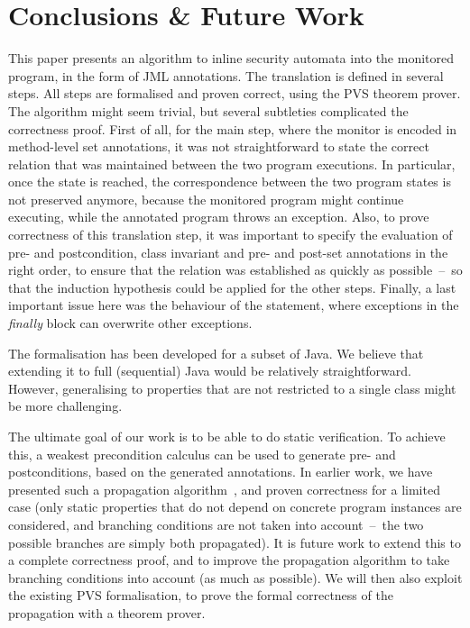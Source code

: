 \section{Conclusions \& Future Work }\label{SecConcl}

This paper presents an algorithm to inline security automata into the
monitored program, in the form of JML annotations. The translation is
defined in several steps. All steps are formalised and proven correct,
using the PVS theorem prover. The algorithm might seem trivial, but
several subtleties complicated the correctness proof. First of all,
for the main step, where the monitor is encoded in method-level set
annotations, it was not straightforward to state the correct relation
that was maintained between the two program executions. In particular,
once the \halted state is reached, the correspondence between the two
program states is not preserved anymore, because the monitored program
might continue executing, while the annotated program throws an
exception. Also, to prove correctness of this translation step, it was
important to specify the evaluation of pre- and postcondition, class
invariant and pre- and post-set annotations in the right order, to ensure
that the relation was established as quickly as possible~--~so that
the induction hypothesis could be applied for the other
steps. Finally, a last important issue here was the behaviour of the
\TryCatch statement, where exceptions in the \emph{finally} block can
overwrite other exceptions.

The formalisation has been developed for a subset of Java. We believe
that extending it to full (sequential) Java would be relatively
straightforward. However, generalising to properties that are not
restricted to a single class might be more challenging.

The ultimate goal of our work is to be able to do static
verification. To achieve this, a weakest precondition calculus can be
used to generate pre- and postconditions, based on the generated \Set
annotations. In earlier work, we have presented such a propagation
algorithm~\cite{PavlovaBBHL04}, and proven correctness for a limited
case (only static properties that do not depend on concrete program
instances are considered, and branching conditions are not taken into
account~--~the two possible branches are simply both propagated). It
is future work to extend this to a complete correctness proof, and to
improve the propagation algorithm to take branching conditions into
account (as much as possible). We will then also exploit the existing
PVS formalisation, to prove the formal correctness of the propagation
with a theorem prover.
